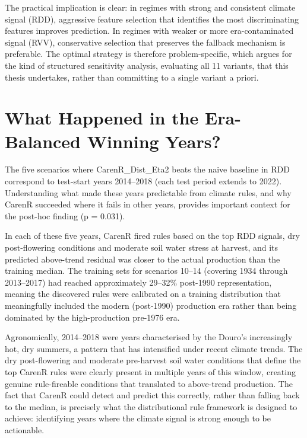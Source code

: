 The practical implication is clear: in regimes with strong and consistent climate signal (RDD), aggressive feature selection that identifies the most discriminating features improves prediction. In regimes with weaker or more era-contaminated signal (RVV), conservative selection that preserves the fallback mechanism is preferable. The optimal strategy is therefore problem-specific, which argues for the kind of structured sensitivity analysis, evaluating all 11 variants, that this thesis undertakes, rather than committing to a single variant a priori.


\section{What Happened in the Era-Balanced Winning Years?}\label{sec:what_happened_in_the}

The five scenarios where CarenR\_Dist\_Eta2 beats the naive baseline in RDD correspond to test-start years 2014--2018 (each test period extends to 2022). Understanding what made these years predictable from climate rules, and why CarenR succeeded where it fails in other years, provides important context for the post-hoc finding (p = 0.031).

In each of these five years, CarenR fired rules based on the top RDD signals, dry post-flowering conditions and moderate soil water stress at harvest, and its predicted above-trend residual was closer to the actual production than the training median. The training sets for scenarios 10--14 (covering 1934 through 2013--2017) had reached approximately 29--32\% post-1990 representation, meaning the discovered rules were calibrated on a training distribution that meaningfully included the modern (post-1990) production era rather than being dominated by the high-production pre-1976 era.

Agronomically, 2014--2018 were years characterised by the Douro's increasingly hot, dry summers, a pattern that has intensified under recent climate trends. The dry post-flowering and moderate pre-harvest soil water conditions that define the top CarenR rules were clearly present in multiple years of this window, creating genuine rule-fireable conditions that translated to above-trend production. The fact that CarenR could detect and predict this correctly, rather than falling back to the median, is precisely what the distributional rule framework is designed to achieve: identifying years where the climate signal is strong enough to be actionable.

